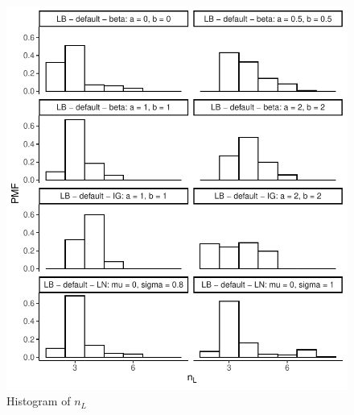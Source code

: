 \documentclass{amsart}
\begin{document}
\begin{figure}[ht]
	\centering
	\includegraphics[width=0.95\linewidth]{hist_nl_2.pdf}
	\caption{Histogram of $n_L$}
	\label{fig:hist:nl:2}
\end{figure}
\end{document}
